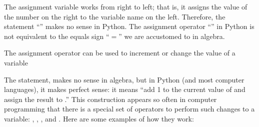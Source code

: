 \documentclass[letterpaper,10pt,english]{sphinxmanual}
\begin{document}
\begin{sphinxVerbatim}[commandchars=\\\{\},numbers=left,firstnumber=1,stepnumber=1]






\end{sphinxVerbatim}

\sphinxAtStartPar
The assignment variable works from right to left; that is, it assigns the value of the number on the right to the variable name on the left.  Therefore, the statement “” makes no sense in Python.  The assignment operator “\sphinxcode{\sphinxupquote{=}}” in Python is not equivalent to the equals sign “\(=\)” we are accustomed to in algebra.

\sphinxAtStartPar
The assignment operator can be used to increment or change the value of a variable

\begin{sphinxVerbatim}[commandchars=\\\{\}]
  

\end{sphinxVerbatim}

\sphinxAtStartPar
The statement,  makes no sense in algebra, but in Python (and most computer languages), it makes perfect sense: it means “add 1 to the current value of  and assign the result to .”  This  construction appears so often in computer programming that there is a special set of operators to perform such changes to a variable: \sphinxcode{\sphinxupquote{+=}}, \sphinxcode{\sphinxupquote{\sphinxhyphen{}=}}, \sphinxcode{\sphinxupquote{*=}}, and \sphinxcode{\sphinxupquote{/=}}.  Here are some examples of how they work:
\end{document}
